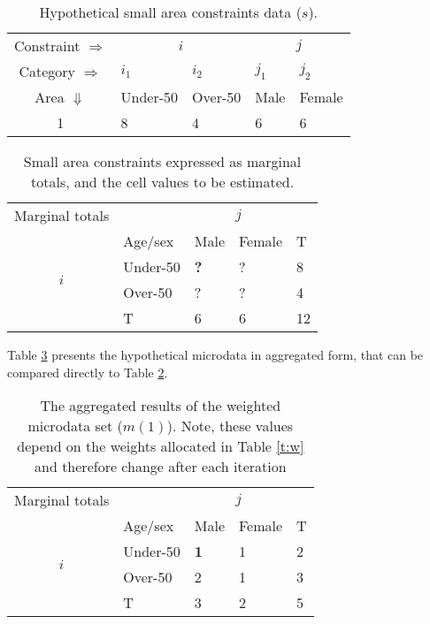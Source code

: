 \begin{table}[htbp]
\centering
\caption{Hypothetical small area constraints data ($s$).}
\begin{tabular}{cllll}
\toprule
Constraint $\Rightarrow$ & \multicolumn{2}{c}{$i$}& \multicolumn{2}{c}{$j$}\\
Category $\Rightarrow$ & $i_1$ & $i_2$ & $j_1$ & $j_2$ \\
Area $\Downarrow$  & Under-50 & Over-50 &  Male & Female\\
1  & 8 & 4 & 6 & 6\\
\bottomrule
\end{tabular}
\label{t:s}
\end{table}
\vspace{1cm}

\begin{table}[htbp]
\centering
\caption[Small area constraints expressed as marginal totals]{Small
area constraints expressed as marginal totals, and the cell
values to be estimated.}
\begin{tabular}{cllll}\toprule
Marginal totals&  & \multicolumn{2}{c}{$j$} & \\
& Age/sex & Male & Female & T\\ \midrule
\multirow{2}{*}{$i$} & Under-50 & \textbf{?} & ? & 8\\
& Over-50 & ? & ? &4 \\
& T & 6 & 6 &12\\
\bottomrule
\end{tabular}
\label{t:s2}
\end{table}

Table \ref{t:m} presents the
hypothetical microdata in aggregated form,
that can be compared directly to Table \ref{t:s2}.

\begin{table}[htbp]
\centering
\caption[The aggregated results of the weighted
microdata set]{The aggregated results of the weighted
microdata set ($m(1)$).
Note, these values depend on the
weights allocated in Table \ref{t:w} and therefore
 change after each iteration}

\begin{tabular}{cllll}\toprule
Marginal totals&  & \multicolumn{2}{c}{$j$} & \\
& Age/sex & Male & Female & T\\ \midrule
\multirow{2}{*}{$i$} & Under-50 & \textbf{1} & 1 & 2\\
& Over-50 & 2 & 1 &3 \\
& T & 3 & 2 &5\\
\bottomrule
\end{tabular}
\label{t:m}
\end{table}


